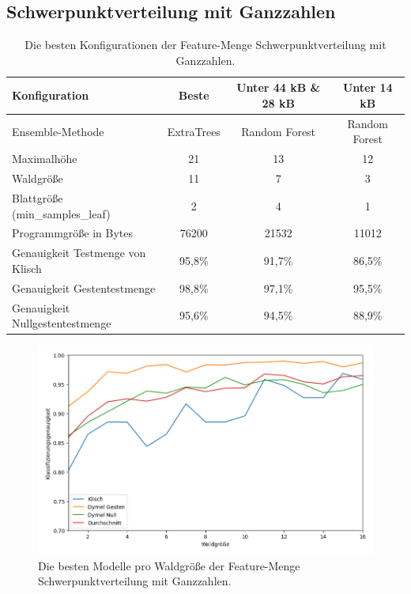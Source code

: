 \subsection{Schwerpunktverteilung mit Ganzzahlen}
\begin{table}[h!]
    \hspace{-0.5cm}
    \begin{tabular}{ | l | c | c | c |}
        \hline
        Konfiguration & Beste & Unter 44 kB \& 28 kB & Unter 14 kB \\\hline
        Ensemble-Methode & ExtraTrees & Random Forest & Random Forest \\\hline
        Maximalhöhe & 21 & 13 & 12 \\\hline
        Waldgröße & 11 & 7 & 3 \\\hline
        Blattgröße (min\_samples\_leaf) & 2 & 4 & 1 \\\hline
        Programmgröße in Bytes & 76200 & 21532 & 11012 \\\hline
        Genauigkeit Testmenge von Klisch & 95,8\% & 91,7\% & 86,5\% \\\hline
        Genauigkeit Gestentestmenge & 98,8\% & 97,1\% & 95,5\% \\\hline
        Genauigkeit Nullgestentestmenge & 95,6\% & 94,5\% & 88,9\% \\\hline
    \end{tabular}
    \caption{Die besten Konfigurationen der Feature-Menge Schwerpunktverteilung mit Ganzzahlen.}
    \label{tab:schwerpunktverteilung_int}
\end{table}
\begin{figure}[h!]
    \centering
    \includegraphics[width=\linewidth]{images/cocd_int_acc_per_size.png}
    \caption{Die besten Modelle pro Waldgröße der Feature-Menge Schwerpunktverteilung mit Ganzzahlen.}
    \label{fig:cocd_int_per_forest_size}
\end{figure}
